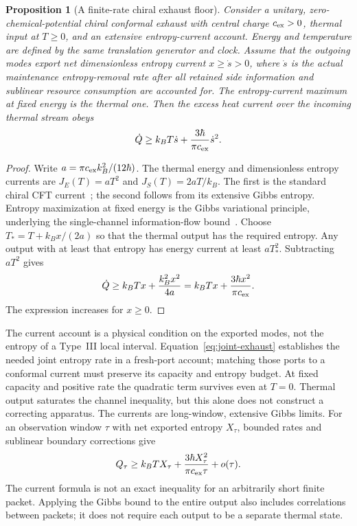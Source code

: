 \documentclass[12pt,a4paper]{article}
\newtheorem{proposition}[theorem]{Proposition}
\begin{document}
\begin{proposition}[A finite-rate chiral exhaust floor]\label{prop:chiral-floor}
Consider a unitary, zero-chemical-potential chiral conformal exhaust with central charge
$c_{\rm ex}>0$, thermal input at $T\ge0$, and an extensive entropy-current account.
Energy and temperature are defined by the same translation generator and clock.
Assume that the outgoing modes export net dimensionless entropy current
$x\ge\dot s>0$, where $\dot s$ is the actual maintenance entropy-removal rate after
all retained side information and sublinear resource consumption are accounted for.
The entropy-current maximum at fixed energy is the thermal one. Then the excess
heat current over the incoming thermal stream obeys
\begin{equation}\label{eq:chiral-floor}
 \dot Q\ge k_BT\dot s+\frac{3\hbar}{\pi c_{\rm ex}}\dot s^2.
\end{equation}
\end{proposition}
\begin{proof}
Write $a=\pi c_{\rm ex}k_B^2/(12\hbar)$. The thermal energy and dimensionless
entropy currents are $J_E(T)=aT^2$ and $J_S(T)=2aT/k_B$.
The first is the standard chiral CFT current~\cite[Eq.~(1)]{BernardDoyon2012};
the second follows from its extensive Gibbs entropy. Entropy maximization at
fixed energy is the Gibbs variational principle, underlying the single-channel
information-flow bound~\cite{Pendry1983}.
Choose $T_*=T+k_Bx/(2a)$ so that the thermal output has the required entropy.
Any output with at least that entropy has energy current at least $aT_*^2$.
Subtracting $aT^2$ gives
\[
 \dot Q\ge k_BTx+\frac{k_B^2x^2}{4a}
            =k_BTx+\frac{3\hbar x^2}{\pi c_{\rm ex}}.
\]
The expression increases for $x\ge0$.
\end{proof}

The current account is a physical condition on the exported modes, not the entropy
of a Type~III local interval. Equation~\eqref{eq:joint-exhaust} establishes the
needed joint entropy rate in a fresh-port account; matching those ports to a conformal current
must preserve its capacity and entropy budget. At fixed capacity and positive
rate the quadratic term survives even at $T=0$. Thermal output saturates the
channel inequality, but this alone does not construct a correcting apparatus.
The currents are long-window, extensive Gibbs limits. For an observation window
$\tau$ with net exported entropy $X_\tau$, bounded rates and sublinear boundary
corrections give
\[
 Q_\tau\ge k_BT X_\tau+
 \frac{3\hbar X_\tau^2}{\pi c_{\rm ex}\tau}+o(\tau).
\]
The current formula is not an exact inequality for an arbitrarily short finite
packet. Applying the Gibbs bound to the entire output also includes correlations
between packets; it does not require each output to be a separate thermal state.
\end{document}
